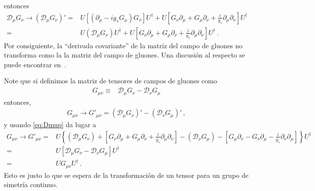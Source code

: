 \begin{frame}
entonces
\begin{align}
\label{eq:Dmup}
\mathcal{D}_{\mu} G_{\nu}\to   \left(   \mathcal{D}_{\mu} G_{\nu} \right)' =& U \left[ \left( \partial_{\mu}-ig_s G_{\mu} \right)G_\nu   \right]U^{\dagger}
    + U \left[ G_{\nu} \partial_{\mu}+G_{\mu}\partial_{\nu}+\frac{i}{g_s} \partial_{\mu}\partial_{\nu} \right] U^{\dagger} \nonumber\\
 =& U \left( \mathcal{D}_{\mu}G_\nu   \right)U^{\dagger}
    + U \left[ G_{\nu} \partial_{\mu}+G_{\mu}\partial_{\nu}+\frac{i}{g_s} \partial_{\mu}\partial_{\nu} \right] U^{\dagger} \,.%
\end{align} 
Por consiguiente, la ``derivada covariante'' de la matriz del campo de gluones no transforma como la la matriz del campo de gluones. Una discusión al respecto se puede encontrar en~\cite{2015arXiv151203827R}.

Note que si definimos la matriz de tensores de campos de gluones como
\begin{align}
   G_{\mu\nu}\equiv & \mathcal{D}_{\mu} G_{\nu}-\mathcal{D}_{\nu} G_{\mu} 
\end{align}
entonces,
\begin{align}
   G_{\mu\nu}\to  G'_{\mu\nu}=\left( \mathcal{D}_{\mu} G_{\nu} \right)'-\left( \mathcal{D}_{\nu} G_{\mu}  \right)'\,,
\end{align}
y usando \eqref{eq:Dmup} da lugar a
\begin{align}
\label{eq:ugum}
    G_{\mu\nu}\to  G'_{\mu\nu}=&  U \left\{ \left( \mathcal{D}_{\mu}G_\nu   \right)
    +  \left[ G_{\nu} \partial_{\mu}+G_{\mu}\partial_{\nu}+\frac{i}{g_s} \partial_{\mu}\partial_{\nu} \right]
  -   \left( \mathcal{D}_{\nu}G_\mu   \right)
    - \left[ G_{\mu} \partial_{\nu}-G_{\nu}\partial_{\mu}-\frac{i}{g_s} \partial_{\nu}\partial_{\mu} \right]  \right\} U^{\dagger} \nonumber\\
=&  U \left[  \mathcal{D}_{\mu}G_\nu 
    -   \mathcal{D}_{\nu}G_\mu
  \right] U^{\dagger} \nonumber\\
=& U G_{\mu\nu} U^{\dagger}\,.
\end{align}
Esto es justo lo que se espera de la transformación de un tensor para un grupo de simetría continuo. 


\end{frame}
